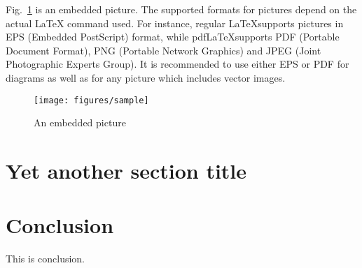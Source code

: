 \documentclass{cseminar}
\begin{document}
Fig.~\ref{fig:mypicture1} is an embedded picture. The supported formats for pictures
depend on the actual LaTeX command used. For instance, regular \LaTeX supports
pictures in EPS (Embedded PostScript) format, while pdf\LaTeX supports PDF (Portable
Document Format), PNG (Portable Network Graphics) and JPEG (Joint Photographic Experts
Group). It is recommended to use either EPS or PDF for diagrams as well as for any picture
which includes vector images.

\begin{figure}[t]
  \begin{center}
    \texttt{[image: figures/sample]}
    \caption{An embedded picture}
    \label{fig:mypicture1}
  \end{center}
\end{figure}




\section{Yet another section title}




\section{Conclusion}
This is conclusion.




\fi

\end{document}
